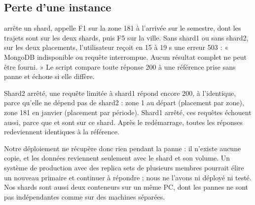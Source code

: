 \subsection{Perte d'une instance}
 arrête un shard, appelle F1 sur la zone 181 à l'arrivée sur le
semestre, dont les trajets sont sur les deux shards, puis F5 sur la ville. Sans shard1 ou
sans shard2, sur les deux placements, l'utilisateur reçoit en 15 à 19 s une erreur 503 :
« MongoDB indisponible ou requête interrompue. Aucun résultat complet ne peut être
fourni. » Le script compare toute réponse 200 à une référence prise sans panne et échoue
si elle diffère.

Shard2 arrêté, une requête limitée à shard1 répond encore 200, à l'identique, parce
qu'elle ne dépend pas de shard2 : zone 1 au départ (placement par zone), zone 181 en
janvier (placement par période). Shard1 arrêté, ces requêtes échouent aussi, parce que
 et  sont sur ce shard. Après le redémarrage, toutes les
réponses redeviennent identiques à la référence.

Notre déploiement ne récupère donc rien pendant la panne : il n'existe aucune copie, et
les données reviennent seulement avec le shard et son volume. Un système de production
avec des replica sets de plusieurs membres pourrait élire un nouveau primaire et
continuer à répondre ; nous ne l'avons ni déployé ni testé. Nos shards sont aussi deux
conteneurs sur un même PC, dont les pannes ne sont pas indépendantes comme sur des
machines séparées.
